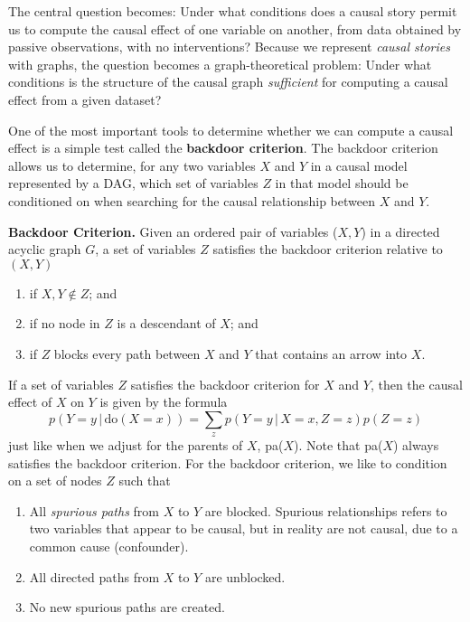 \documentclass{article}
\newcommand{\giv}{\,|\,}
\begin{document}
The central question becomes: Under what conditions does a causal story permit us to compute the causal effect of one variable on another, from data obtained by passive observations, with no interventions? Because we represent \textit{causal stories} with graphs, the question becomes a graph-theoretical problem: Under what conditions is the structure of the causal graph \textit{sufficient} for computing a causal effect from a given dataset? 

One of the most important tools to determine whether we can compute a causal effect is a simple test called the \textbf{backdoor criterion}. The backdoor criterion allows us to determine, for any two variables $X$ and $Y$ in a causal model represented by a DAG, which set of variables $Z$ in that model should be conditioned on when searching for the causal relationship between $X$ and $Y$. 
\\
\begin{theorem}
    \textbf{Backdoor Criterion.} Given an ordered pair of variables ($X, Y$) in a directed acyclic graph $G$, a set of variables $Z$ satisfies the backdoor criterion relative to $(X, Y)$
    \begin{enumerate}
        \item if $X, Y \not \in Z$; and
        \item if no node in $Z$ is a descendant of $X$; and
        \item if $Z$ blocks every path between $X$ and $Y$ that contains an arrow into $X$. 
    \end{enumerate}
\end{theorem}

\noindent If a set of variables $Z$ satisfies the backdoor criterion for $X$ and $Y$, then the causal effect of $X$ on $Y$ is given by the formula
$$
    p(Y = y \giv \text{do}(X=x)) = \sum_z p(Y=y \giv X=x, Z=z)p(Z=z)
$$
just like when we adjust for the parents of $X$, pa($X$). Note that pa($X$) always satisfies the backdoor criterion. For the backdoor criterion, we like to condition on a set of nodes $Z$ such that 
\begin{enumerate}
    \item All \textit{spurious paths} from $X$ to $Y$ are blocked. Spurious relationships refers to two variables that appear to be causal, but in reality are not causal, due to a common cause (confounder). 
    \item All directed paths from $X$ to $Y$ are unblocked. 
    \item No new spurious paths are created. 
\end{enumerate}
\end{document}
